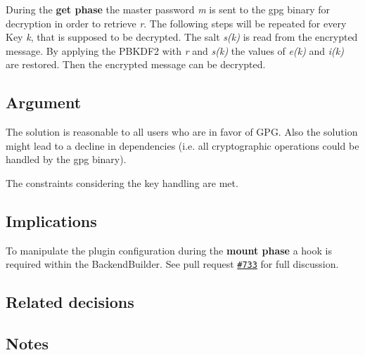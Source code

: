 During the {\bfseries get phase} the master password {\itshape m} is sent to the gpg binary for decryption in order to retrieve {\itshape r}. The following steps will be repeated for every Key {\itshape k}, that is supposed to be decrypted. The salt {\itshape s(k)} is read from the encrypted message. By applying the P\+B\+K\+D\+F2 with {\itshape r} and {\itshape s(k)} the values of {\itshape e(k)} and {\itshape i(k)} are restored. Then the encrypted message can be decrypted.

\subsection*{Argument}

The solution is reasonable to all users who are in favor of G\+P\+G. Also the solution might lead to a decline in dependencies (i.\+e. all cryptographic operations could be handled by the gpg binary).

The constraints considering the key handling are met.

\subsection*{Implications}

To manipulate the plugin configuration during the {\bfseries mount phase} a hook is required within the {\ttfamily Backend\+Builder}. See pull request \href{https://github.com/ElektraInitiative/libelektra/pull/733}{\tt \#733} for full discussion.

\subsection*{Related decisions}

\subsection*{Notes}